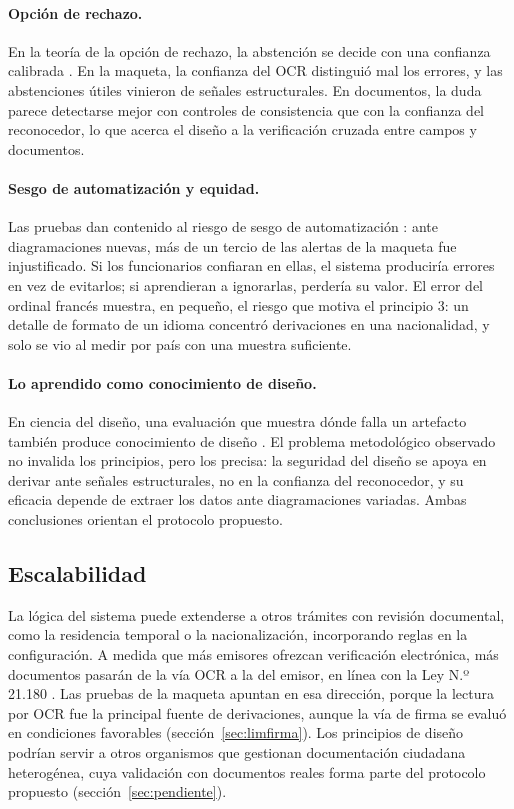 \documentclass[11pt,a4paper]{article}
\begin{document}
\paragraph{Opción de rechazo.} En la teoría de la opción de rechazo, la abstención se decide con una confianza calibrada \cite{chow1970,geifman2017}. En la maqueta, la confianza del OCR distinguió mal los errores, y las abstenciones útiles vinieron de señales estructurales. En documentos, la duda parece detectarse mejor con controles de consistencia que con la confianza del reconocedor, lo que acerca el diseño a la verificación cruzada entre campos y documentos.

\paragraph{Sesgo de automatización y equidad.} Las pruebas dan contenido al riesgo de sesgo de automatización \cite{parasuraman2010,alonbarkat2023}: ante diagramaciones nuevas, más de un tercio de las alertas de la maqueta fue injustificado. Si los funcionarios confiaran en ellas, el sistema produciría errores en vez de evitarlos; si aprendieran a ignorarlas, perdería su valor. El error del ordinal francés muestra, en pequeño, el riesgo que motiva el principio 3: un detalle de formato de un idioma concentró derivaciones en una nacionalidad, y solo se vio al medir por país con una muestra suficiente.

\paragraph{Lo aprendido como conocimiento de diseño.} En ciencia del diseño, una evaluación que muestra dónde falla un artefacto también produce conocimiento de diseño \cite{hevner2004,venable2016}. El problema metodológico observado no invalida los principios, pero los precisa: la seguridad del diseño se apoya en derivar ante señales estructurales, no en la confianza del reconocedor, y su eficacia depende de extraer los datos ante diagramaciones variadas. Ambas conclusiones orientan el protocolo propuesto.

\subsection{Escalabilidad}

La lógica del sistema puede extenderse a otros trámites con revisión documental, como la residencia temporal o la nacionalización, incorporando reglas en la configuración. A medida que más emisores ofrezcan verificación electrónica, más documentos pasarán de la vía OCR a la del emisor, en línea con la Ley N.º 21.180 \cite{ley21180}. Las pruebas de la maqueta apuntan en esa dirección, porque la lectura por OCR fue la principal fuente de derivaciones, aunque la vía de firma se evaluó en condiciones favorables (sección~\ref{sec:limfirma}). Los principios de diseño podrían servir a otros organismos que gestionan documentación ciudadana heterogénea, cuya validación con documentos reales forma parte del protocolo propuesto (sección~\ref{sec:pendiente}).
\end{document}
